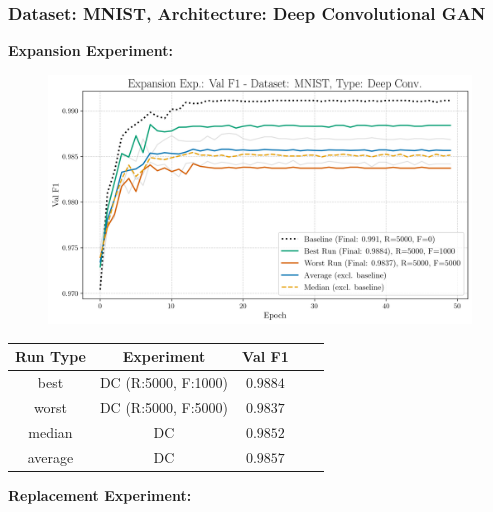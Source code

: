 \subsubsection{Dataset: MNIST, Architecture: Deep Convolutional GAN}\label{app_STRAT_CLASS_PERF_mnist_DCGAN}
\noindent\textbf{Expansion Experiment:}
\begin{figure}[htbp]
	\centering
	\includegraphics[width=.85\textwidth]{abb/strat_classifier_performance/MNIST_STRATIFIED_CLASSIFIERS_VANILLA_GAN/expansion_experiments/val_f1_score_['VANILLA']_MNIST_all.png}
	\label{fig:app_strat_class_performance_expansion_exp_val_f1_score_DCGAN}
\end{figure}
\begin{table}[H]
	\centering
	\vspace{-1em}
	\begin{tabular}{|c|c|c|c|c|}
		\hline
		Run Type & Experiment & Val F1 \\ \hline
		best & DC (R:5000, F:1000) & $0.9884$\\ \hline
		worst & DC (R:5000, F:5000) & $0.9837$\\ \hline
		median & DC & $0.9852$\\ \hline
		average & DC & $0.9857$
		\\ \hline
	\end{tabular}
\end{table}
\noindent\textbf{Replacement Experiment:}
